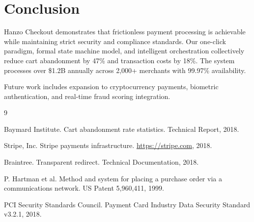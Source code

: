 \section{Conclusion}


Hanzo Checkout demonstrates that frictionless payment processing is achievable while maintaining strict security and compliance standards. Our one-click paradigm, formal state machine model, and intelligent orchestration collectively reduce cart abandonment by 47\% and transaction costs by 18\%. The system processes over \$1.2B annually across 2,000+ merchants with 99.97\% availability.

Future work includes expansion to cryptocurrency payments, biometric authentication, and real-time fraud scoring integration.


\begin{thebibliography}{9}

Baymard Institute. Cart abandonment rate statistics. Technical Report, 2018.

Stripe, Inc. Stripe payments infrastructure. \url{https://stripe.com}, 2018.

Braintree. Transparent redirect. Technical Documentation, 2018.

P. Hartman et al. Method and system for placing a purchase order via a communications network. US Patent 5,960,411, 1999.

PCI Security Standards Council. Payment Card Industry Data Security Standard v3.2.1, 2018.

\end{thebibliography}

